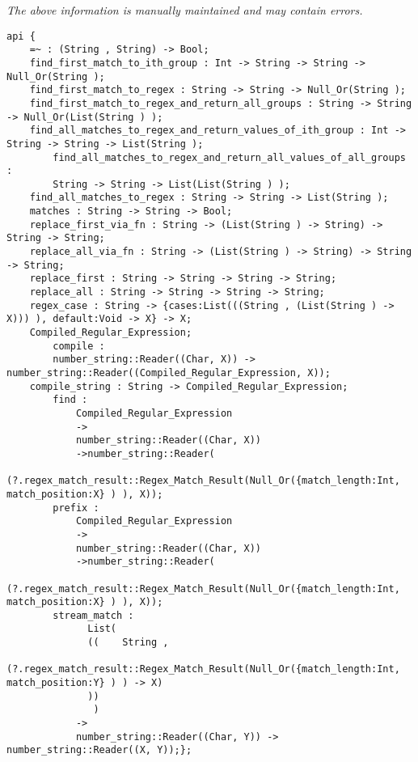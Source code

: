 \label{api:Regular\_Expression\_Matcher}

{\tiny \it The above information is manually maintained and may contain errors.}
\begin{verbatim}
api {
    =~ : (String , String) -> Bool;
    find_first_match_to_ith_group : Int -> String -> String -> Null_Or(String );
    find_first_match_to_regex : String -> String -> Null_Or(String );
    find_first_match_to_regex_and_return_all_groups : String -> String -> Null_Or(List(String ) );
    find_all_matches_to_regex_and_return_values_of_ith_group : Int -> String -> String -> List(String );
        find_all_matches_to_regex_and_return_all_values_of_all_groups :
        String -> String -> List(List(String ) );
    find_all_matches_to_regex : String -> String -> List(String );
    matches : String -> String -> Bool;
    replace_first_via_fn : String -> (List(String ) -> String) -> String -> String;
    replace_all_via_fn : String -> (List(String ) -> String) -> String -> String;
    replace_first : String -> String -> String -> String;
    replace_all : String -> String -> String -> String;
    regex_case : String -> {cases:List(((String , (List(String ) -> X))) ), default:Void -> X} -> X;
    Compiled_Regular_Expression;
        compile :
        number_string::Reader((Char, X)) -> number_string::Reader((Compiled_Regular_Expression, X));
    compile_string : String -> Compiled_Regular_Expression;
        find :
            Compiled_Regular_Expression
            ->
            number_string::Reader((Char, X))
            ->number_string::Reader(
              (?.regex_match_result::Regex_Match_Result(Null_Or({match_length:Int, match_position:X} ) ), X));
        prefix :
            Compiled_Regular_Expression
            ->
            number_string::Reader((Char, X))
            ->number_string::Reader(
              (?.regex_match_result::Regex_Match_Result(Null_Or({match_length:Int, match_position:X} ) ), X));
        stream_match :
              List(
              ((    String ,
                    (?.regex_match_result::Regex_Match_Result(Null_Or({match_length:Int, match_position:Y} ) ) -> X)
              ))
               )
            ->
            number_string::Reader((Char, Y)) -> number_string::Reader((X, Y));};
\end{verbatim}
\index[fun]{=~}
